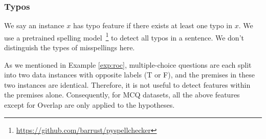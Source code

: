 \subsubsection{Typos}
We say an instance $x$ has typo feature if there exists at least one
typo in $x$.
We use a pretrained spelling model~\footnote{\url{https://github.com/barrust/pyspellchecker}} 
to detect all typos in a sentence. We don't distinguish the types of misspellings here. 

As we mentioned in Example \ref{exp:roc}, multiple-choice questions are each split into 
two data instances with opposite labels (T or F), and the premises in these two
instances are identical. Therefore, it is not useful to detect features within the premises
alone. Consequently, for MCQ datasets, all the above features except for Overlap
are only applied to the hypotheses.



